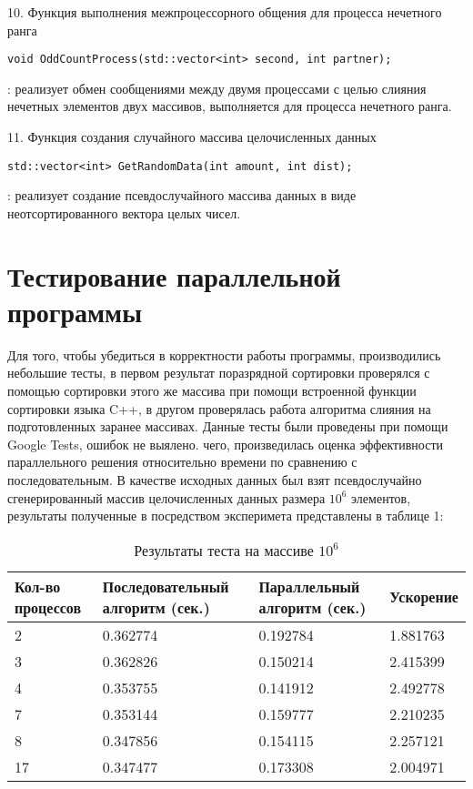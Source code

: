 \documentclass[12pt]{report}
\begin{document}
\par 10. Функция выполнения межпроцессорного общения для процесса нечетного ранга
\begin{lstlisting}
void OddCountProcess(std::vector<int> second, int partner);
\end{lstlisting}
: реализует обмен сообщениями между двумя процессами с целью слияния нечетных элементов двух массивов, выполняется для процесса нечетного ранга.

\par 11. Функция создания случайного массива целочисленных данных
\begin{lstlisting}
std::vector<int> GetRandomData(int amount, int dist);
\end{lstlisting}
: реализует создание псевдослучайного массива данных в виде неотсортированного вектора целых чисел.

\newpage

\section*{Тестирование параллельной программы}
Для того, чтобы убедиться в корректности работы программы, производились небольшие тесты, в первом результат поразрядной сортировки проверялся с помощью сортировки этого же массива при помощи встроенной функции сортировки языка C++, в другом проверялась работа алгоритма слияния на подготовленных заранее массивах. Данные тесты были проведены при помощи Google Tests, ошибок не выялено.
 чего, произведилась оценка эффективности параллельного решения относительно времени по сравнению с последовательным. В качестве исходных данных был взят псевдослучайно сгенерированный массив целочисленных данных размера $10^{6}$ элементов, результаты полученные в посредством эксперимета представлены в таблице 1:

\begin{table}[!h]
    \centering
    \begin{tabular}{ | l | l | l | l |}
    \hline
    \scriptsize{Кол-во процессов} & \scriptsize{Последовательный алгоритм (сек.)} & \scriptsize{Параллельный алгоритм (сек.)} & \scriptsize{Ускорение}  \\ \hline
    2   &   0.362774    &   0.192784    &   1.881763 \\ \hline
    3   &   0.362826    &   0.150214    &   2.415399  \\ \hline
    4   &   0.353755    &   0.141912    &   2.492778  \\ \hline
    7   &   0.353144    &   0.159777    &   2.210235  \\ \hline
    8   &   0.347856    &   0.154115    &   2.257121  \\ \hline
    17   &  0.347477    &   0.173308    &   2.004971  \\ \hline
    \end{tabular}
    \caption{Результаты теста на массиве $10^6$}
    \end{table}
\end{document}
